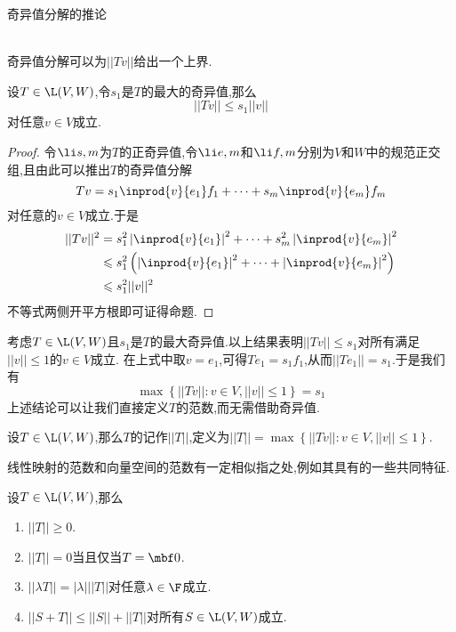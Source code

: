 \documentclass{ctexart}
\begin{document}
\pagestyle{empty}
\begin{center}\large 奇异值分解的推论\end{center}
\\
奇异值分解可以为$||Tv||$给出一个上界.
\begin{formal}[1.1 $||Tv||$的上界]
    设$T\in\L(V,W)$,令$s_1$是$T$的最大的奇异值,那么
    \[||Tv||\leqslant s_1||v||\]
    对任意$v\in V$成立.
\end{formal}
\begin{proof}
    令$\li s,m$为$T$的正奇异值,令$\li e,m$和$\li f,m$分别为$V$和$W$中的规范正交组,且由此可以推出$T$的奇异值分解
    \[Tv=s_1\inprod{v}{e_1}f_1+\cdots+s_m\inprod{v}{e_m}f_m\]
    对任意的$v\in V$成立.于是
    \[\begin{aligned}
        ||Tv||^2
        &= s_1^2\left|\inprod{v}{e_1}\right|^2+\cdots+s_m^2\left|\inprod{v}{e_m}\right|^2 \\
        &\leqslant s_1^2\left(\left|\inprod{v}{e_1}\right|^2+\cdots+\left|\inprod{v}{e_m}\right|^2\right) \\
        &\leqslant s_1^2||v||^2
    \end{aligned}\]
    不等式两侧开平方根即可证得命题.
\end{proof}\noindent
考虑$T\in\L(V,W)$且$s_1$是$T$的最大奇异值.以上结果表明$||Tv||\leqslant s_1$对所有满足$||v||\leqslant 1$的$v\in V$成立.%
在上式中取$v=e_1$,可得$Te_1=s_1f_1$,从而$||Te_1||=s_1$.于是我们有
\[\max\left\{||Tv||:v\in V,||v||\leqslant 1\right\}=s_1\]
上述结论可以让我们直接定义$T$的范数,而无需借助奇异值.
\begin{definition}[1.2 定义:线性映射的范数]
    设$T\in\L(V,W)$,那么$T$的记作$||T||$,定义为$||T||=\max\left\{||Tv||:v\in V,||v||\leqslant 1\right\}$.
\end{definition}\noindent
线性映射的范数和向量空间的范数有一定相似指之处,例如其具有的一些共同特征.
\begin{formal}[1.3 线性映射范数的基本性质]
    设$T\in\L(V,W)$,那么
    \begin{enumerate}[label=\tbf{(\alph*)}]
        \item $||T||\geqslant0$.
        \item $||T||=0$当且仅当$T=\mbf0$.
        \item $||\lambda T||=|\lambda|||T||$对任意$\lambda\in\F$成立.
        \item $||S+T||\leqslant||S||+||T||$对所有$S\in\L(V,W)$成立.
    \end{enumerate}
\end{formal}\noindent
\end{document}
